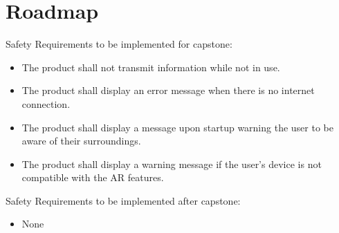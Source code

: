 \documentclass{article}
\begin{document}
\section{Roadmap}

Safety Requirements to be implemented for capstone:
\begin{itemize}
    \item The product shall not transmit information while not in use.
    \item The product shall display an error message when there is no internet connection.
    \item The product shall display a message upon startup warning the user to be aware of their surroundings.
    \item The product shall display a warning message if the user's device is not compatible with the AR features.
\end{itemize}

\noindent
Safety Requirements to be implemented after capstone:
\begin{itemize}
    \item None
\end{itemize}
\end{document}

